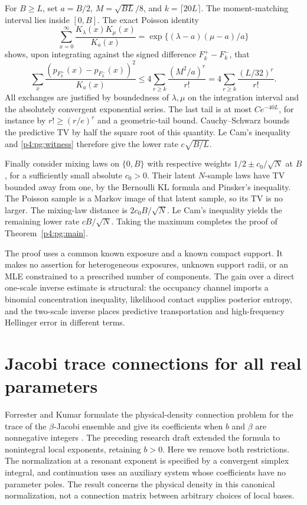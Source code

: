 \documentclass[11pt,a4paper]{article}
\theoremstyle{definition}
\theoremstyle{remark}
\numberwithin{equation}{section}
\begin{document}
For $B\ge L$, set $a=B/2$, $M=\sqrt{BL}/8$, and
$k=\lceil20L\rceil$.  The moment-matching interval lies inside
$[0,B]$.  The exact Poisson identity
\[
 \sum_{x=0}^\infty\frac{K_\lambda(x)K_\mu(x)}{K_a(x)}
                   =\exp\{(\lambda-a)(\mu-a)/a\}
\]
shows, upon integrating against the signed difference $F_k^+-F_k^-$,
that
\[
 \sum_x\frac{(p_{F_k^+}(x)-p_{F_k^-}(x))^2}{K_a(x)}
 \le4\sum_{r\ge k}\frac{(M^2/a)^r}{r!}
 =4\sum_{r\ge k}\frac{(L/32)^r}{r!}.
\]
All exchanges are justified by boundedness of $\lambda,\mu$ on
the integration interval and the absolutely convergent exponential
series.  The last tail is at most $Ce^{-40L}$, for instance by
$r!\ge(r/e)^r$ and a geometric-tail bound.  Cauchy--Schwarz bounds
the predictive TV by half the square root of this quantity.
Le Cam's inequality and \eqref{p4:pg:witness} therefore give the
lower rate $c\sqrt{B/L}$.

Finally consider mixing laws on $\{0,B\}$ with respective weights
$1/2\pm c_0/\sqrt N$ at $B$, for a sufficiently small absolute
$c_0>0$.  Their latent $N$-sample laws have TV bounded away from
one, by the Bernoulli KL formula and Pinsker's inequality.  The
Poisson sample is a Markov image of that latent sample, so its TV
is no larger.  The mixing-law distance is $2c_0B/\sqrt N$.
Le Cam's inequality yields the remaining lower rate $cB/\sqrt N$.
Taking the maximum completes the proof of Theorem~\ref{p4:pg:main}.

The proof uses a common known exposure and a known compact support.
It makes no assertion for heterogeneous exposures, unknown support
radii, or an MLE constrained to a prescribed number of components.
The gain over a direct one-scale inverse estimate is structural:
the occupancy channel imports a binomial concentration inequality,
likelihood contact supplies posterior entropy, and the two-scale
inverse places predictive transportation and high-frequency
Hellinger error in different terms.



\section{Jacobi trace connections for all real parameters}
\label{p4:sec:JG}

Forrester and Kumar formulate the physical-density connection problem
for the trace of the $\beta$-Jacobi ensemble and give its coefficients
when $b$ and $\beta$ are nonnegative integers
\cite[Proposition 1.3 and Section 3.3]{p8:SFB_FK}.
The preceding research draft extended the formula to nonintegral local
exponents, retaining $b>0$. Here we remove both restrictions.
The normalization at a resonant exponent is specified by a convergent
simplex integral, and continuation uses an auxiliary system whose
coefficients have no parameter poles. The result concerns the physical
density in this canonical normalization, not a connection matrix between
arbitrary choices of local bases.
\end{document}
